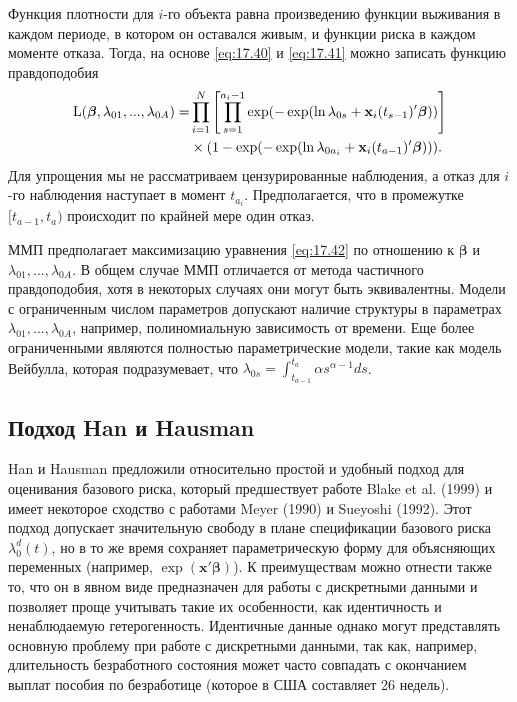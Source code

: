 Функция плотности для $i$-го объекта равна произведению функции выживания в каждом периоде, в котором он оставался живым, и функции риска в каждом моменте отказа. Тогда, на основе \ref{eq:17.40} и \ref{eq:17.41} можно записать функцию правдоподобия
        \begin{align}
        \label{eq:17.42}
        \mathrm{L}(\bm{\beta},\lambda_{01},...,\lambda_{0A})=&\prod^{N}_{i=1}\left[\prod^{a_i-1}_{s=1}\exp(-\exp(\ln\lambda_{0s}+\mathbf{x}_i(t_{s-1})'\bm{\beta}))\right]\\
        &\times(1-\exp(-\exp(\ln\lambda_{0a_i}+\mathbf{x}_i(t_{a-1})'\bm{\beta}))).\notag
        \end{align}
Для упрощения мы не рассматриваем цензурированные наблюдения, а отказ для $i$-го наблюдения наступает в момент $t_{a_i}$. Предполагается, что в промежутке $[t_{a-1},t_a)$ происходит по крайней мере один отказ.

ММП предполагает максимизацию уравнения \ref{eq:17.42} по отношению к $\bm{\beta}$ и $\lambda_{01},...,\lambda_{0A}$. В общем случае ММП отличается от метода частичного правдоподобия, хотя в некоторых случаях они могут быть эквивалентны. Модели с ограниченным числом параметров допускают наличие структуры в параметрах $\lambda_{01},...,\lambda_{0A}$, например, полиномиальную зависимость от времени. Еще более ограниченными являются полностью параметрические модели, такие как модель Вейбулла, которая подразумевает, что $\lambda_{0s}=\int^{t_a}_{t_{a-1}}\alpha s^{\alpha-1}ds$.


\subsection{Подход Han и Hausman}\label{sec:17.10.2}

\noindent
Han и Hausman предложили относительно простой и удобный подход для оценивания базового риска, который предшествует работе Blake et al. (1999) и имеет некоторое сходство с работами Meyer (1990) и Sueyoshi (1992). Этот подход допускает значительную свободу в плане спецификации базового риска $\lambda^{d}_{0}(t)$, но в то же время сохраняет параметрическую форму для объясняющих переменных (например, $\exp(\mathbf{x}'\bm{\beta})$). К преимуществам можно отнести также то, что он в явном виде предназначен для работы с дискретными данными и позволяет проще учитывать такие их особенности, как идентичность и ненаблюдаемую гетерогенность. Идентичные данные однако могут представлять основную проблему при работе с дискретными данными, так как, например, длительность безработного состояния может часто совпадать с окончанием выплат пособия по безработице (которое в США составляет 26 недель).

